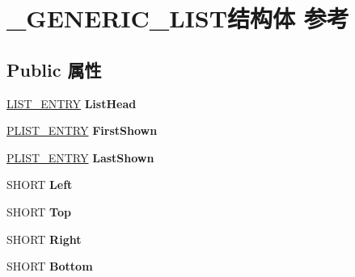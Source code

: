 \hypertarget{struct___g_e_n_e_r_i_c___l_i_s_t}{}\section{\+\_\+\+G\+E\+N\+E\+R\+I\+C\+\_\+\+L\+I\+S\+T结构体 参考}
\label{struct___g_e_n_e_r_i_c___l_i_s_t}
\subsection*{Public 属性}
\begin{DoxyCompactItemize}
\item 
\mbox{\label{struct___g_e_n_e_r_i_c___l_i_s_t_a0b49be440cbd68dd1539891958cea232}} 
\hyperlink{struct___l_i_s_t___e_n_t_r_y}{L\+I\+S\+T\+\_\+\+E\+N\+T\+RY} {\bfseries List\+Head}
\item 
\mbox{\label{struct___g_e_n_e_r_i_c___l_i_s_t_aa9b46126c3df60c61ad2d4b729bc692c}} 
\hyperlink{struct___l_i_s_t___e_n_t_r_y}{P\+L\+I\+S\+T\+\_\+\+E\+N\+T\+RY} {\bfseries First\+Shown}
\item 
\mbox{\label{struct___g_e_n_e_r_i_c___l_i_s_t_ac77f5b2b878519a47507807712dc8ac5}} 
\hyperlink{struct___l_i_s_t___e_n_t_r_y}{P\+L\+I\+S\+T\+\_\+\+E\+N\+T\+RY} {\bfseries Last\+Shown}
\item 
\mbox{\label{struct___g_e_n_e_r_i_c___l_i_s_t_aa7b3304d134e915b6c1f46887de7f862}} 
S\+H\+O\+RT {\bfseries Left}
\item 
\mbox{\label{struct___g_e_n_e_r_i_c___l_i_s_t_ac99b19fae5ee5eaf00cf103b622a375b}} 
S\+H\+O\+RT {\bfseries Top}
\item 
\mbox{\label{struct___g_e_n_e_r_i_c___l_i_s_t_aca5320c65713265cdaa6f3164519238d}} 
S\+H\+O\+RT {\bfseries Right}
\item 
\mbox{\label{struct___g_e_n_e_r_i_c___l_i_s_t_a28be1bec8e32613a8a53885072ff177f}} 
S\+H\+O\+RT {\bfseries Bottom}
\item 
\mbox{\label{struct___g_e_n_e_r_i_c___l_i_s_t_a477f6804645666b3a4e1e04da1753e20}} 

\end{DoxyCompactItemize}
